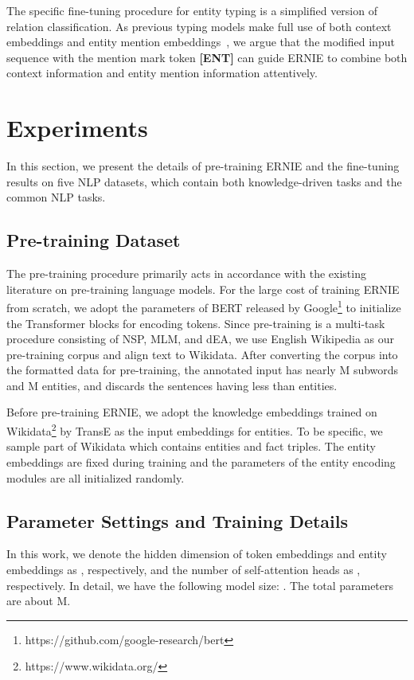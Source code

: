 \documentclass[11pt,a4paper]{article}
\begin{document}
The specific fine-tuning procedure for entity typing is a simplified version of relation classification. As previous typing models make full use of both context embeddings and entity mention embeddings~\cite{shimaoka2016attentive,yaghoobzadeh2017multi,xin2018put}, we argue that the modified input sequence with the mention mark token \textbf{[ENT]} can guide ERNIE to combine both context information and entity mention information attentively.


\section{Experiments}

In this section, we present the details of pre-training ERNIE and the fine-tuning results on five NLP datasets, which contain both knowledge-driven tasks and the common NLP tasks.

\subsection{Pre-training Dataset}

The pre-training procedure primarily acts in accordance with the existing literature on pre-training language models. For the large cost of training ERNIE from scratch, we adopt the parameters of BERT released by Google\footnote{https://github.com/google-research/bert} to initialize the Transformer blocks for encoding tokens. Since pre-training is a multi-task procedure consisting of NSP, MLM, and dEA, we use English Wikipedia as our pre-training corpus and align text to Wikidata. After converting the corpus into the formatted data for pre-training, the annotated input has nearly M subwords and M entities, and discards the sentences having less than  entities.

Before pre-training ERNIE, we adopt the knowledge embeddings trained on Wikidata\footnote{https://www.wikidata.org/} by TransE as the input embeddings for entities. To be specific, we sample part of Wikidata which contains  entities and  fact triples. The entity embeddings are fixed during training and the parameters of the entity encoding modules are all initialized randomly.

\subsection{Parameter Settings and Training Details}

In this work, we denote the hidden dimension of token embeddings and entity embeddings as ,  respectively, and the number of self-attention heads as ,  respectively. In detail, we have the following model size: . The total parameters are about M.
\end{document}
